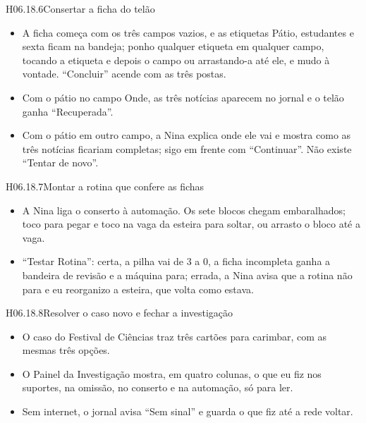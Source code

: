 \begin{historia}{H06.18.6}{Consertar a ficha do telão}{\pronto}
\aceite
\begin{itemize}
  \item A ficha começa com os três campos vazios, e as etiquetas Pátio,
    estudantes e sexta ficam na bandeja; ponho qualquer etiqueta em qualquer
    campo, tocando a etiqueta e depois o campo ou arrastando-a até ele, e
    mudo à vontade. \enquote{Concluir} acende com as três postas.
  \item Com o pátio no campo Onde, as três notícias aparecem no jornal e o
    telão ganha \enquote{Recuperada}.
  \item Com o pátio em outro campo, a Nina explica onde ele vai e mostra como
    as três notícias ficariam completas; sigo em frente com
    \enquote{Continuar}. Não existe \enquote{Tentar de novo}.
\end{itemize}
\end{historia}

\begin{historia}{H06.18.7}{Montar a rotina que confere as fichas}{\pronto}
\aceite
\begin{itemize}
  \item A Nina liga o conserto à automação. Os sete blocos chegam embaralhados;
    toco para pegar e toco na vaga da esteira para soltar, ou arrasto o bloco
    até a vaga.
  \item \enquote{Testar Rotina}: certa, a pilha vai de 3 a 0, a ficha
    incompleta ganha a bandeira de revisão e a máquina para; errada, a Nina
    avisa que a rotina não para e eu reorganizo a esteira, que volta como
    estava.
\end{itemize}
\end{historia}

\begin{historia}{H06.18.8}{Resolver o caso novo e fechar a investigação}{\pronto}
\aceite
\begin{itemize}
  \item O caso do Festival de Ciências traz três cartões para carimbar, com as
    mesmas três opções.
  \item O Painel da Investigação mostra, em quatro colunas, o que eu fiz nos
    suportes, na omissão, no conserto e na automação, só para ler.
  \item Sem internet, o jornal avisa \enquote{Sem sinal} e guarda o que fiz
    até a rede voltar.
\end{itemize}
\end{historia}


